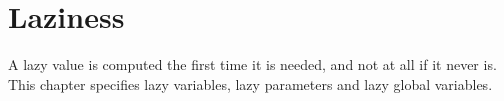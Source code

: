 \chapter{Laziness}%
\label{chap:lazy}

A lazy value is computed the first time it is needed, and not at all if it never
is. This chapter specifies lazy variables, lazy parameters and lazy global
variables.

\minitoc%


